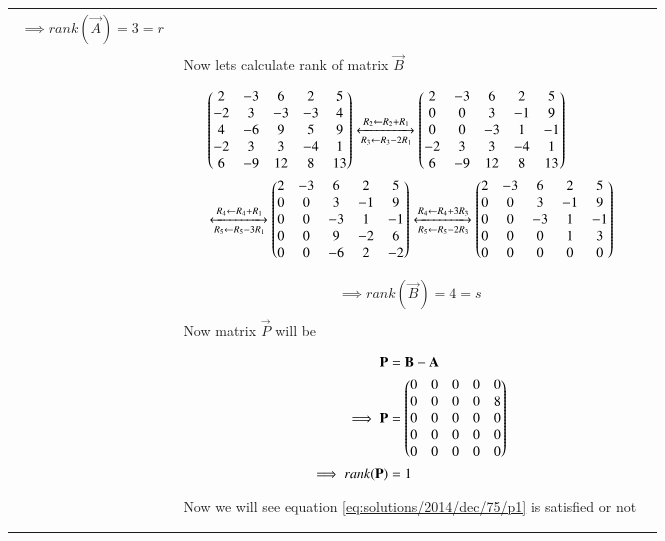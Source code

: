 \begin{longtable}{|l|l|l|}
{\begin{align}
    \implies rank(\vec{A})=3=r\label{eq:solutions/2014/dec/75/ra}
\end{align}}&\\&Now lets calculate rank of matrix $\vec{B}$&\\&\parbox{14cm}{\begin{align}
    &\begin{pmatrix}2&-3&6&2&5\\-2&3&-3&-3&4\\4&-6&9&5&9\\-2&3&3&-4&1\\6&-9&12&8&13\end{pmatrix}\xleftrightarrow[R_3\leftarrow R_3-2R_1]{R_2\leftarrow R_2+R_1}\begin{pmatrix}2&-3&6&2&5\\0&0&3&-1&9\\0&0&-3&1&-1\\-2&3&3&-4&1\\6&-9&12&8&13\end{pmatrix}\\
    &\xleftrightarrow[R_5\leftarrow R_5-3R_1]{R_4\leftarrow R_4+R_1}\begin{pmatrix}2&-3&6&2&5\\0&0&3&-1&9\\0&0&-3&1&-1\\0&0&9&-2&6\\0&0&-6&2&-2\end{pmatrix}\xleftrightarrow[R_5\leftarrow R_5-2R_3]{R_4\leftarrow R_4+3R_3}\begin{pmatrix}2&-3&6&2&5\\0&0&3&-1&9\\0&0&-3&1&-1\\0&0&0&1&3\\0&0&0&0&0\end{pmatrix}
\end{align}}&\\&\parbox{14cm}{\begin{align}
    \implies rank(\vec{B})=4=s\label{eq:solutions/2014/dec/75/rb}
\end{align}}&\\&Now matrix $\vec{P}$ will be&\\&\parbox{14cm}{\begin{align}
    \mathbf{P}&=\mathbf{B}-\mathbf{A}\\
    \implies\mathbf{P}&=\begin{pmatrix}0&0&0&0&0\\0&0&0&0&8\\0&0&0&0&0\\0&0&0&0&0\\0&0&0&0&0\end{pmatrix}\label{eq:solutions/2014/dec/75/P}\\
    \implies rank(\mathbf{P})&=1
\end{align}}&\\&Now we will see equation \eqref{eq:solutions/2014/dec/75/p1} is satisfied or not&\\&\parbox{14cm}{\begin{align}

\end{align}}
\end{longtable}
